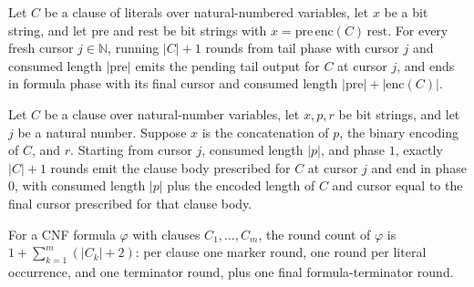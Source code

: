 \begin{lemma}
\label{Complexity.satStreamRun_tail}
\leanok
{}
Let $C$ be a clause of literals over natural-numbered variables, let $x$ be a bit
string, and let $\mathrm{pre}$ and $\mathrm{rest}$ be bit strings with
$x=\mathrm{pre}\,\mathrm{enc}(C)\,\mathrm{rest}$. For every fresh cursor
$j\in\mathbb{N}$, running $|C|+1$ rounds from tail phase with cursor $j$ and consumed
length $|\mathrm{pre}|$ emits the pending tail output for $C$ at cursor $j$, and ends in
formula phase with its final cursor and consumed length
$|\mathrm{pre}|+|\mathrm{enc}(C)|$.
\end{lemma}

\begin{lemma}
\label{Complexity.satStreamRun_clause}
\leanok
{}
Let $C$ be a clause over natural-number variables, let $x,p,r$ be bit strings, and let
$j$ be a natural number. Suppose $x$ is the concatenation of $p$, the binary encoding of
$C$, and $r$. Starting from cursor $j$, consumed length $|p|$, and phase $1$, exactly
$|C|+1$ rounds emit the clause body prescribed for $C$ at cursor $j$ and end in phase
$0$, with consumed length $|p|$ plus the encoded length of $C$ and cursor equal to the
final cursor prescribed for that clause body.
\end{lemma}

\begin{definition}
\label{Complexity.satStreamCount}
\leanok
For a CNF formula $\varphi$ with clauses $C_1, \dots, C_m$, the round count of
$\varphi$ is $1 + \sum_{k=1}^{m} (|C_k| + 2)$: per clause one marker round, one
round per literal occurrence, and one terminator round, plus one final
formula-terminator round.
\end{definition}

